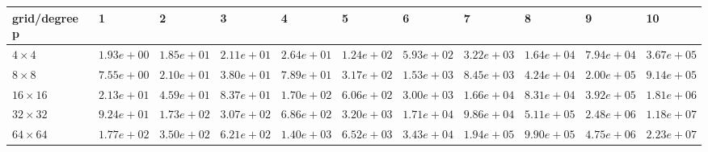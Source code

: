 \begin{tabular}{lllllllllll}
\hline
 grid/degree p   & 1          & 2          & 3          & 4          & 5          & 6          & 7          & 8          & 9          & 10         \\
\hline
 $4 \times 4$    & $1.93e+00$ & $1.85e+01$ & $2.11e+01$ & $2.64e+01$ & $1.24e+02$ & $5.93e+02$ & $3.22e+03$ & $1.64e+04$ & $7.94e+04$ & $3.67e+05$ \\
 $8 \times 8$    & $7.55e+00$ & $2.10e+01$ & $3.80e+01$ & $7.89e+01$ & $3.17e+02$ & $1.53e+03$ & $8.45e+03$ & $4.24e+04$ & $2.00e+05$ & $9.14e+05$ \\
 $16 \times 16$  & $2.13e+01$ & $4.59e+01$ & $8.37e+01$ & $1.70e+02$ & $6.06e+02$ & $3.00e+03$ & $1.66e+04$ & $8.31e+04$ & $3.92e+05$ & $1.81e+06$ \\
 $32 \times 32$  & $9.24e+01$ & $1.73e+02$ & $3.07e+02$ & $6.86e+02$ & $3.20e+03$ & $1.71e+04$ & $9.86e+04$ & $5.11e+05$ & $2.48e+06$ & $1.18e+07$ \\
 $64 \times 64$  & $1.77e+02$ & $3.50e+02$ & $6.21e+02$ & $1.40e+03$ & $6.52e+03$ & $3.43e+04$ & $1.94e+05$ & $9.90e+05$ & $4.75e+06$ & $2.23e+07$ \\
\hline
\end{tabular}